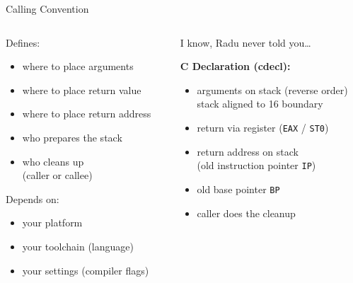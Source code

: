 \documentclass[beamer]{uibk}
\begin{document}
\begin{frame}{Calling Convention}
    \begin{columns}
        \begin{column}{0.5\textwidth}
            Defines:

            \begin{itemize}
                \item where to place arguments
                \item where to place return value
                \item where to place return address
                \item who prepares the stack
                \item who cleans up\\
                    (caller or callee)
            \end{itemize}
            \pause

            Depends on:

            \begin{itemize}
                \item your platform
                \item your toolchain (language)
                \item your settings (compiler flags)
            \end{itemize}
        \end{column}
        \pause
        \begin{column}{0.5\textwidth}
            I know, Radu never told you\dots
            \medskip

            \textbf{C Declaration (cdecl):}

            \begin{itemize}
                \item arguments on stack (reverse order)\\
                    stack aligned to \SI{16}{\byte} boundary
                \item return via register (\texttt{EAX} / \texttt{ST0})
                \item return address on stack\\
                    (old instruction pointer \texttt{IP})
                \item old base pointer \texttt{BP}
                \item caller does the cleanup
            \end{itemize}
        \end{column}
    \end{columns}
\end{frame}
\end{document}
